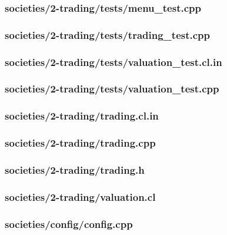 \documentclass{article}
\begin{document}
\subsubsection*{societies/2-trading/tests/menu\_test.cpp}


\subsubsection*{societies/2-trading/tests/trading\_test.cpp}


\subsubsection*{societies/2-trading/tests/valuation\_test.cl.in}


\subsubsection*{societies/2-trading/tests/valuation\_test.cpp}


\subsubsection*{societies/2-trading/trading.cl.in}


\subsubsection*{societies/2-trading/trading.cpp}


\subsubsection*{societies/2-trading/trading.h}


\subsubsection*{societies/2-trading/valuation.cl}


\subsubsection*{societies/config/config.cpp}

\end{document}
